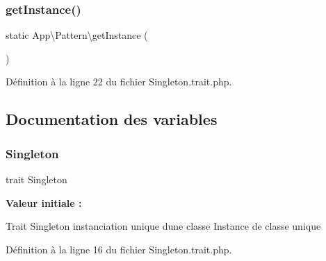 \subsubsection{\texorpdfstring{get\+Instance()}{getInstance()}}
{\footnotesize\ttfamily static App\textbackslash{}\+Pattern\textbackslash{}get\+Instance (\begin{DoxyParamCaption}{ }\end{DoxyParamCaption})\hspace{0.3cm}{\ttfamily [static]}}



Définition à la ligne 22 du fichier Singleton.\+trait.\+php.



\subsection{Documentation des variables}
\mbox{\label{namespace_app_1_1_pattern_a90c7994df18fc2d358849f9a46502bc1}} 
\subsubsection{\texorpdfstring{Singleton}{Singleton}}
{\footnotesize\ttfamily trait Singleton}

{\bfseries Valeur initiale \+:}
Trait Singleton instanciation unique d\textquotesingle{}une classe Instance de classe unique 

Définition à la ligne 16 du fichier Singleton.\+trait.\+php.

